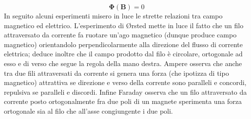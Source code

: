 \documentclass[
10pt, %
a4paper, %
oneside, %
headinclude,footinclude, %
BCOR5mm, %
]{scrartcl}
\begin{document}
\[\mathbf{\Phi}(\mathbf{B}) = 0\] 
In seguito alcuni esperimenti misero in luce le strette relazioni tra campo magnetico ed elettrico. L'esperimento di \O{}rsted mette in luce il fatto che un filo attraversato da corrente fa ruotare un'ago magnetico (dunque produce campo magnetico) orientandolo perpendicolarmente alla direzione del flusso di corrente elettrica; deduce inoltre che il campo prodotto dal filo è circolare, ortogonale ad esso e di verso che segue la regola della mano destra. Ampere osserva che anche tra due fili attraversati da corrente si genera una forza (che ipotizza di tipo magnetico) attrattiva se direzione e verso della corrente sono paralleli e concordi, repulsiva se paralleli e discordi. Infine Faraday osserva che un filo attraversato da corrente posto ortogonalmente fra due poli di un magnete sperimenta una forza ortogonale sia al filo che all'asse congiungente i due poli.\\
\end{document}
